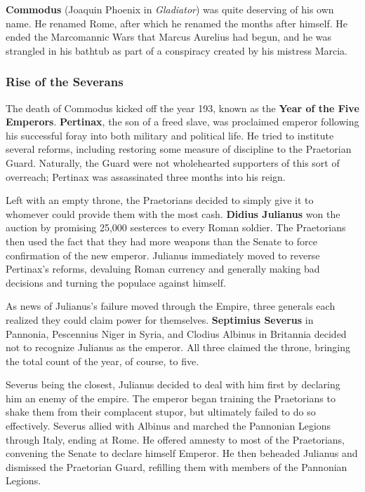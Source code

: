 \textbf{Commodus} (Joaquin Phoenix in \textit{Gladiator}) was quite deserving of his own name.
He renamed Rome, after which he renamed the months after himself.
He ended the Marcomannic Wars that Marcus Aurelius had begun,
and he was strangled in his bathtub as part of a conspiracy created by his mistress Marcia.

\subsubsection*{Rise of the Severans}

The death of Commodus kicked off the year 193, known as the \textbf{Year of the Five Emperors}.
\textbf{Pertinax}, the son of a freed slave,
was proclaimed emperor following his successful foray into both military and political life.
He tried to institute several reforms,
including restoring some measure of discipline to the Praetorian Guard.
Naturally, the Guard were not wholehearted supporters of this sort of overreach;
Pertinax was assassinated three months into his reign.

Left with an empty throne,
the Praetorians decided to simply give it to whomever could provide them with the most cash.
\textbf{Didius Julianus} won the auction by promising 25,000 sesterces to every Roman soldier.
The Praetorians then used the fact that they had more weapons than the Senate
to force confirmation of the new emperor.
Julianus immediately moved to reverse Pertinax's reforms,
devaluing Roman currency and generally making bad decisions
and turning the populace against himself.

As news of Julianus's failure moved through the Empire,
three generals each realized they could claim power for themselves.
\textbf{Septimius Severus} in Pannonia,
Pescennius Niger in Syria,
and Clodius Albinus in Britannia
decided not to recognize Julianus as the emperor.
All three claimed the throne, bringing the total count of the year, of course, to five.

Severus being the closest,
Julianus decided to deal with him first by declaring him an enemy of the empire.
The emperor began training the Praetorians to shake them from their complacent stupor,
but ultimately failed to do so effectively.
Severus allied with Albinus and marched the Pannonian Legions through Italy, ending at Rome.
He offered amnesty to most of the Praetorians,
convening the Senate to declare himself Emperor.
He then beheaded Julianus
and dismissed the Praetorian Guard, refilling them with members of the Pannonian Legions.

